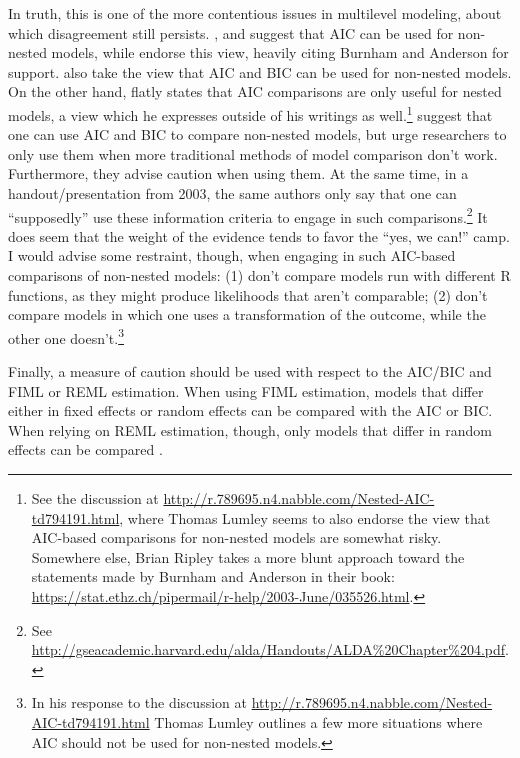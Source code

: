 \documentclass[12pt,english]{article}\usepackage[]{graphicx}\usepackage[usenames, dvipsnames]{xcolor}
\begin{document}
In truth, this is one of the more contentious issues in multilevel modeling, about which disagreement still persists. ,  and  suggest that AIC can be used for non-nested models, while  endorse this view, heavily citing Burnham and Anderson for support.  also take the view that AIC and BIC can be used for non-nested models. On the other hand,  flatly states that AIC comparisons are only useful for nested models, a view which he expresses outside of his writings as well.\footnote{See the discussion at \url{http://r.789695.n4.nabble.com/Nested-AIC-td794191.html}, where Thomas Lumley seems to also endorse the view that AIC-based comparisons for non-nested models are somewhat risky. Somewhere else, Brian Ripley takes a more blunt approach toward the statements made by Burnham and Anderson in their book: \url{https://stat.ethz.ch/pipermail/r-help/2003-June/035526.html}.}  suggest that one can use AIC and BIC to compare non-nested models, but urge researchers to only use them when more traditional methods of model comparison don't work. Furthermore, they advise caution when using them. At the same time, in a handout/presentation from 2003, the same authors only say that one can ``supposedly'' use these information criteria to engage in such comparisons.\footnote{See \url{http://gseacademic.harvard.edu/alda/Handouts/ALDA\%20Chapter\%204.pdf}.} It does seem that the weight of the evidence tends to favor the ``yes, we can!'' camp. I would advise some restraint, though, when engaging in such AIC-based comparisons of non-nested models: (1) don't compare models run with different R functions, as they might produce likelihoods that aren't comparable; (2) don't compare models in which one uses a transformation of the outcome, while the other  one doesn't.\footnote{In his response to the discussion at \url{http://r.789695.n4.nabble.com/Nested-AIC-td794191.html} Thomas Lumley outlines a few more situations where AIC should not be used for non-nested models.}

Finally, a measure of caution should be used with respect to the AIC/BIC and FIML or REML estimation. When using FIML estimation, models that differ either in fixed effects or random effects can be compared with the AIC or BIC. When relying on REML estimation, though, only models that differ in random effects can be compared \cite[p.~51]{hox_multilevel_2010}.
\end{document}
